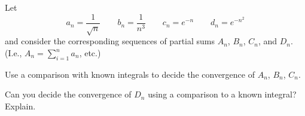 \documentclass{workbook}
\begin{document}
\begin{slide}
	\question
	Let
	\[
		a_n =\frac{1}{\sqrt{n}}\qquad b_n=\frac{1}{n^3}\qquad c_n=e^{-n}
		\qquad d_n=e^{-n^2}
	\]
	and consider the corresponding sequences of partial sums $A_n$, $B_n$,
	$C_n$, and $D_n$. (I.e., $\displaystyle A_n=\sum_{i=1}^n a_n$, etc.)

	\begin{parts}
		\item Use a comparison with known integrals to decide 
		the convergence of $A_n$, $B_n$, $C_n$.
		\item Can you decide the convergence of $D_n$ using a comparison to
		a known integral? Explain.
	\end{parts}
\end{slide}

%
%
%
%
%
\end{document}
